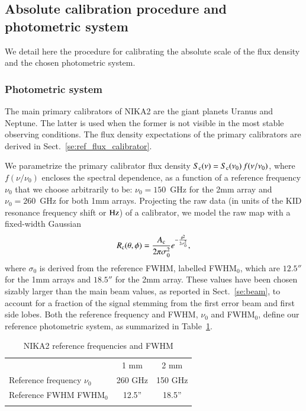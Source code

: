 \subsection{Absolute calibration procedure and photometric system}
\label{se:calibration_method}

We detail here the procedure for calibrating the absolute scale of
the flux density and the chosen photometric system.

\subsubsection{Photometric system}
\label{se:photometric_system}

The main primary calibrators of NIKA2 are the giant planets Uranus and
Neptune. The latter is used when the former is not visible in the most
stable observing conditions. The flux density expectations of the
primary calibrators are derived in Sect.~\ref{se:ref_flux_calibrator}. 

We parametrize the primary calibrator flux density
$S_{\rm{c}}(\nu) = S_{\rm{c}}(\nu_0)\, f(\nu/\nu_{0})$, where $f(\nu/\nu_{0})$
encloses the spectral dependence, 
as a function of a reference frequency $\nu_{0}$ that we choose
arbitrarily to be: $\nu_{0} = 150$~GHz for the 2mm array and
$\nu_{0}= 260$~GHz for both 1mm arrays. Projecting the raw data (in
units of the KID resonance frequency shift or $\rm Hz$) of a
calibrator, we model the raw map with a fixed-width Gaussian
\begin{equation}
  R_{\rm{c}}(\theta, \phi)  = \frac{A_{\rm{c}}}{2 \pi \sigma_{0}^{2}}
  e^{-\frac{\theta^{2}}{2\sigma_{0}^{2}}},
  \label{eq:gaussian_amplitude}
\end{equation}
where $\sigma_{0}$ is derived from the
reference FWHM, labelled FWHM$_{0}$, which are $12.5''$ for the 1mm
arrays and $18.5''$ for the 2mm array. These values have
been chosen sizably larger than the main beam values, as reported in
Sect.~\ref{se:beam}, to account for a fraction of the signal stemming from
the first error beam and first side lobes.
Both the reference frequency and FWHM, $\nu_0$ and FWHM$_{0}$, define our reference photometric system, as
summarized in Table~\ref{tab:definitions}.

\begin{table}[!htbp]
  \begin{center}
    \caption{NIKA2 reference frequencies and FWHM}
    \begin{tabular}{lcc}
      \hline\hline
      \noalign{\smallskip}
      & 1 mm & 2 mm \\
      \noalign{\smallskip}
      \hline
      \noalign{\smallskip}
      Reference frequency $\nu_{0}$ & 260 GHz & 150 GHz \\
      Reference FWHM  FWHM$_{0}$    & 12.5'' & 18.5'' \\
      \noalign{\smallskip}
      \hline
    \end{tabular}
  \end{center}
  \label{tab:definitions}
\end{table}

